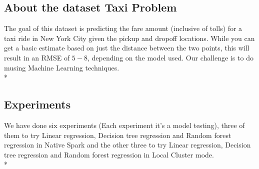 \noindent
\subsection{About the dataset Taxi Problem}

The goal of this dataset is predicting the fare amount (inclusive of tolls) for a taxi ride in New York City given the pickup and dropoff locations. While you can get a basic estimate based on just the distance between the two points, this will result in an RMSE of $5-$8, depending on the model used. Our challenge is to do musing Machine Learning techniques.\\*

\subsection{Experiments }
We have done six experiments (Each experiment it’s a model testing), three of them to try Linear regression, Decision tree regression and Random forest regression in Native Spark and the other three to try Linear regression, Decision tree regression and Random forest regression in Local Cluster mode.\\*


